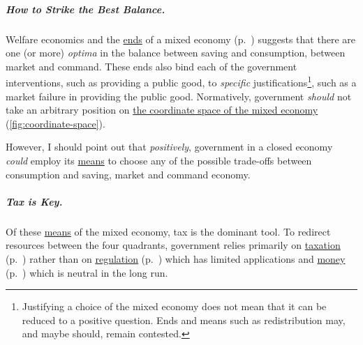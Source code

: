 \subparagraph[Optima]{How to Strike the Best Balance.} Welfare economics and the \hyperref[sec:ends]{ends} of a mixed economy (p.~\pageref{sec:ends}) suggests that there are one (or more) \emph{optima} in the balance between saving and consumption, between market and command. These ends also bind each of the government interventions, such as providing a public good, to \emph{specific} justifications\footnote{
	Justifying a choice of the mixed economy does not mean that it can be reduced to a positive question. Ends and means such as redistribution may, and maybe should, remain contested.}, 
such as a market failure in providing the public good. Normatively, government \emph{should} not take an arbitrary position on \hyperref[fig:coordinate-space]{the coordinate space of the mixed economy} (\autoref{fig:coordinate-space}). 

However, I should point out that \emph{positively}, government in a closed economy \emph{could} employ its \hyperref[sec:means]{means} to choose any of the possible trade-offs between consumption and saving, market and command economy. 

\subparagraph[Tax is Key]{Tax is Key.} Of these \hyperref[sec:means]{means} of the mixed economy, tax is the dominant tool. To redirect resources between the four quadrants, government relies primarily on \hyperref[sec:fiscal]{taxation} (p.~\pageref{sec:fiscal}) rather than on \hyperref[sec:regulatory]{regulation} (p.~\pageref{sec:regulatory}) which has limited applications and \hyperref[sec:monetary]{money} (p.~\pageref{sec:monetary}) which is neutral in the long run.

